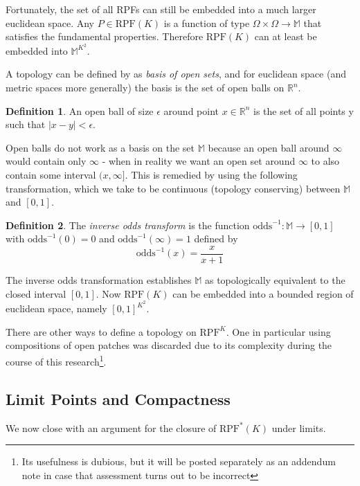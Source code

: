 \documentclass[twoside]{article}
\theoremstyle{plain}%
\theoremstyle{definition}
\newtheorem{definition}{Definition}[section]
\theoremstyle{remark}
\begin{document}
Fortunately, the set of all RPFs can still be embedded into a much larger euclidean space. Any \(P \in \text{RPF}(K)\) is a function of type \(\Omega \times \Omega \rightarrow \mathbb{M}\) that satisfies the fundamental properties. Therefore \(\text{RPF}(K)\) can at least be embedded into \(\mathbb{M}^{K^2}\).

A topology can be defined by as \textit{basis of open sets}, and for euclidean space (and metric spaces more generally) the basis is the set of open balls on \(\mathbb{R}^n\).

\begin{definition}
An open ball of size \(\epsilon\) around point \(x \in \mathbb{R}^n\) is the set of all points y such that \(|x - y| < \epsilon\).
\end{definition}

Open balls do not work as a basis on the set \(\mathbb{M}\) because an open ball around \(\infty\) would contain only \(\infty\) - when in reality we want an open set around \(\infty\) to also contain some interval \((x, \infty]\). This is remedied by using the following transformation, which we take to be continuous (topology conserving) between \(\mathbb{M}\) and \([0, 1]\).

\begin{definition}
The \textit{inverse odds transform} is the function \(\text{odds}^{-1}: \mathbb{M} \rightarrow [0, 1]\) with \(\text{odds}^{-1}(0) = 0\) and \(\text{odds}^{-1}(\infty) = 1\) defined by
\[\text{odds}^{-1}(x) = \frac{x}{x + 1}\]
\end{definition}

The inverse odds transformation establishes \(\mathbb{M}\) as topologically equivalent to the closed interval \([0, 1]\). Now \(\text{RPF}(K)\) can be embedded into a bounded region of euclidean space, namely \([0, 1]^{K^2}\).

There are other ways to define a topology on \(\text{RPF}^K\). One in particular using compositions of open patches was discarded due to its complexity during the course of this research\footnote{Its usefulness is dubious, but it will be posted separately as an addendum note in case that assessment turns out to be incorrect}.

\subsection{Limit Points and Compactness}

We now close with an argument for the closure of \(\text{RPF}^{\ast}(K)\) under limits.
\end{document}
